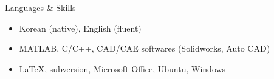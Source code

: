 \begin{rSection}{Languages \& Skills}
  \begin{itemize}
  \item Korean (native), English (fluent)
  \item MATLAB, C/C++, CAD/CAE softwares (Solidworks, Auto CAD)
  \item \LaTeX, subversion, Microsoft Office, Ubuntu, Windows
  \end{itemize}
\end{rSection}
